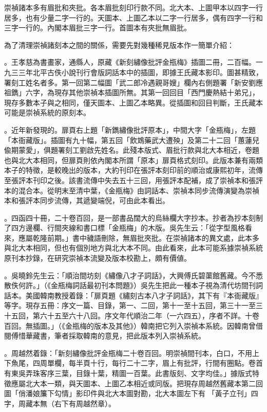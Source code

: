 崇禎諸本多有眉批和夾批。各本眉批刻印行款不同。北大本、上圖甲本以四字一行居多，也有少量二字一行的。天圖本、上圖乙本以二字一行居多，偶有四字一行和三字一行的。內閣本眉批三字一行。首圖本有夾批無眉批。

為了清理崇禎諸刻本之間的關係，需要先對幾種稀見版本作一簡單介紹：

{\large{}}。王孝慈為書畫家，通縣人，原藏《新刻繡像批評金瓶梅》插圖二冊，二百幅。一九三三年北平古佚小說刊行會版詞話本中的插圖，即據王氏藏本影印。圖甚精致，署刻工姓名者多。第一回第二幅圖「武二郎冷遇親哥嫂」欄內右側題署「新安劉應祖鐫」六字，為現存其他崇禎本插圖所無。其第一回回目「西門慶熱結十弟兄」，現存多數本子與之相同，僅天圖本、上圖乙本略異。從插圖和回目判斷，王氏藏本可能是崇禎系統的原刻本。

{\large{}}。近年新發現的。扉頁右上題「新鐫繡像批評原本」，中間大字「金瓶梅」，左題「本衙藏版」。插圖有九十幅，第五回「飲鴆藥武大遭殃」及第二十二回「蕙蓮兒偸期蒙愛」，俱題署刻工劉啟先姓名。此殘本版式、眉批行款與北大本相近，卷題也與北大本相同，但扉頁則依內閣本所謂「原本」扉頁格式刻印。此版本兼有兩類本子的特徵，是較晚出的版本，大約刊印在張評本刻印前的順治或康熙初年，流傳至張評本刊印之後。該書流傳中失去五十三回，用張評本配補，成了崇禎本和張評本的混合本。從明末至清中葉，《金瓶梅》由詞話本、崇禎本同步流傳演變為崇禎本和張評本同步流傳，其遞變端倪，可由此本看出。

{\large{}}。四函四十冊，二十卷百回，是一部書品闊大的烏絲欄大字抄本。抄者為抄本刻制了四方邊欄、行間夾線和書口標「金瓶梅」的木版。吳先生云：「從字型風格看來，應屬乾隆前期。」書中穢語刪除，無眉批夾批。在崇禎諸本的異文處，此本多與北大本相同，但也有個別地方與北大本不同。由此看來，此本可能系據崇禎系統原刊本抄錄，在研究崇禎本流變及版本校勘上，頗有價値。

{\large{}}。吳曉鈴先生云：「順治間坊刻《繡像八才子詞話》，大興傅氏碧蕖館舊藏。今不悉散佚何許。」（《金瓶梅詞話最初刊本問題》）吳先生把此一種本子視為清代坊間刊詞話本。美國韓南教授着錄：「扉頁題《繡刻古本八才子詞話》，其下有『本衙藏版』等字。現存五冊：序文一篇、目錄，第一、二回，第十一至十五回，第三十一至三十五回，第六十五至六十八回。序文年代順治二年（一六四五），序者不詳。十卷百回。無插圖。」（《金瓶梅的版本及其他》）韓南把它列入崇禎本系統。因韓南曾借閱傅惜華藏書，筆者採取韓南的意見，把此版本列入崇禎系統。

{\large{}}。周越然着錄：「新刻繡像批評金瓶梅二十卷百回。明崇禎間刊本，白口，不用上下魚尾，四周單欄，每半頁十行，每行二十二字，眉上有批評，行間有圈點。卷首有東吳弄珠客序三葉，目錄十葉，精圖一百葉。此書版刻、文字均佳。」據版式特徵應屬北大本一類，與天圖本、上圖乙本相近或同版。把現存周越然舊藏本第二回圖「俏潘娘簾下勾情」影印件與北大本圖對勘，北大本圖左下有 「黃子立刊」四字，周藏本無（右下有周越然章）。

